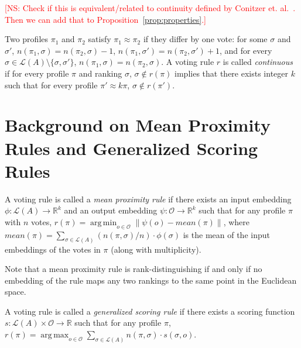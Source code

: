 \documentclass[10pt,letterpaper]{article}
\newcommand{\calL}{{\mathcal{L}}}
\newcommand{\rank}{{\calL(A)}}
\newcommand{\calO}{{\mathcal{O}}}
\DeclareMathOperator*{\argmax}{arg\,max}
\DeclareMathOperator*{\argmin}{arg\,min}
\newenvironment{definition}[1][Definition]{\begin{trivlist}
\item[\hskip \labelsep {\bfseries #1}]}{\end{trivlist}}
\newcommand{\kibitz}[2]{\ifnum\Comments=1\textcolor{#1}{#2}\fi}
\newcommand{\cns}[1]{\kibitz{red} {[NS: #1]}}
\begin{document}

\cns{Check if this is equivalent/related to continuity defined by Conitzer et. al.~\cite{CRX09}. Then we can add that to Proposition~\ref{prop:properties}.}
\begin{definition}[Continuity]
Two profiles $\pi_1$ and $\pi_2$ satisfy $\pi_1 \approx \pi_2$ if they differ by one vote: for some $\sigma$ and $\sigma'$, $n(\pi_1,\sigma) = n(\pi_2,\sigma)-1$, $n(\pi_1,\sigma') = n(\pi_2,\sigma')+1$, and for every $\sigma \in \rank\setminus\{\sigma,\sigma'\}$, $n(\pi_1,\sigma) = n(\pi_2,\sigma)$. A voting rule $r$ is called \emph{continuous} if for every profile $\pi$ and ranking $\sigma$, $\sigma \notin r(\pi)$ implies that there exists integer $k$ such that for every profile $\pi' \approx k \pi$, $\sigma \notin r(\pi')$. 
\end{definition}


\section{Background on Mean Proximity Rules and Generalized Scoring Rules}


\begin{definition}[Mean Proximity Rules (Zwicker~\cite{Zwicker08a})]
A voting rule is called a \emph{mean proximity rule} if there exists an input embedding $\phi : \rank \rightarrow \mathbb{R}^k$ and an output embedding $\psi: \calO \rightarrow \mathbb{R}^k$ such that for any profile $\pi$ with $n$ votes, $r(\pi) = \argmin_{o \in \calO} \|\psi(o) - mean(\pi) \|$, where $mean(\pi) = \sum_{\sigma \in \rank} (n(\pi,\sigma)/n) \cdot \phi(\sigma)$ is the mean of the input embeddings of the votes in $\pi$ (along with multiplicity). 
\end{definition}

Note that a mean proximity rule is rank-distinguishing if and only if no embedding of the rule maps any two rankings to the same point in the Euclidean space. 


\begin{definition}[Generalized Scoring Rules (Zwicker~\cite{Zwicker08a})]
A voting rule is called a \emph{generalized scoring rule} if there exists a scoring function $s : \rank \times \calO \rightarrow \mathbb{R}$ such that for any profile $\pi$, $r(\pi) = \argmax_{o \in \calO} \sum_{\sigma \in \rank} n(\pi,\sigma) \cdot s(\sigma,o)$. 
\end{definition}
\end{document}
